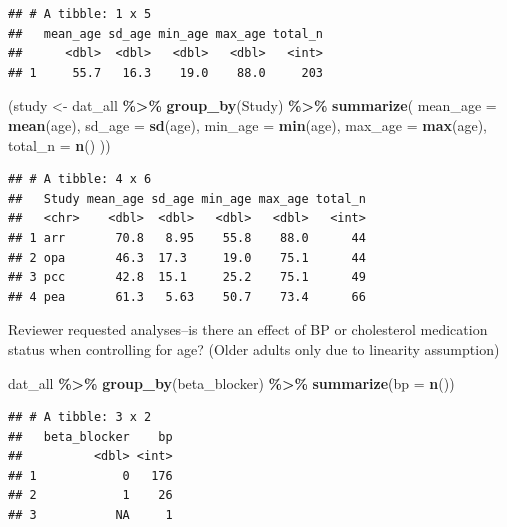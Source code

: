 \documentclass[
]{article}
\newenvironment{Shaded}{\begin{snugshade}}{\end{snugshade}}
\newcommand{\AttributeTok}[1]{\textcolor[rgb]{0.13,0.29,0.53}{#1}}
\newcommand{\FunctionTok}[1]{\textcolor[rgb]{0.13,0.29,0.53}{\textbf{#1}}}
\newcommand{\NormalTok}[1]{#1}
\newcommand{\OtherTok}[1]{\textcolor[rgb]{0.56,0.35,0.01}{#1}}
\newcommand{\SpecialCharTok}[1]{\textcolor[rgb]{0.81,0.36,0.00}{\textbf{#1}}}
\begin{document}
\begin{verbatim}
## # A tibble: 1 x 5
##   mean_age sd_age min_age max_age total_n
##      <dbl>  <dbl>   <dbl>   <dbl>   <int>
## 1     55.7   16.3    19.0    88.0     203
\end{verbatim}

\begin{Shaded}
\begin{Highlighting}[]
\NormalTok{(study }\OtherTok{\textless{}{-}}\NormalTok{ dat\_all }\SpecialCharTok{\%\textgreater{}\%}
  \FunctionTok{group\_by}\NormalTok{(Study) }\SpecialCharTok{\%\textgreater{}\%}
  \FunctionTok{summarize}\NormalTok{(}
    \AttributeTok{mean\_age =} \FunctionTok{mean}\NormalTok{(age),}
    \AttributeTok{sd\_age =} \FunctionTok{sd}\NormalTok{(age),}
    \AttributeTok{min\_age =} \FunctionTok{min}\NormalTok{(age),}
    \AttributeTok{max\_age =} \FunctionTok{max}\NormalTok{(age),}
    \AttributeTok{total\_n =} \FunctionTok{n}\NormalTok{()}
\NormalTok{  ))}
\end{Highlighting}
\end{Shaded}

\begin{verbatim}
## # A tibble: 4 x 6
##   Study mean_age sd_age min_age max_age total_n
##   <chr>    <dbl>  <dbl>   <dbl>   <dbl>   <int>
## 1 arr       70.8   8.95    55.8    88.0      44
## 2 opa       46.3  17.3     19.0    75.1      44
## 3 pcc       42.8  15.1     25.2    75.1      49
## 4 pea       61.3   5.63    50.7    73.4      66
\end{verbatim}

Reviewer requested analyses--is there an effect of BP or cholesterol
medication status when controlling for age? (Older adults only due to
linearity assumption)

\begin{Shaded}
\begin{Highlighting}[]
\NormalTok{dat\_all }\SpecialCharTok{\%\textgreater{}\%} \FunctionTok{group\_by}\NormalTok{(beta\_blocker) }\SpecialCharTok{\%\textgreater{}\%} \FunctionTok{summarize}\NormalTok{(}\AttributeTok{bp =} \FunctionTok{n}\NormalTok{())}
\end{Highlighting}
\end{Shaded}

\begin{verbatim}
## # A tibble: 3 x 2
##   beta_blocker    bp
##          <dbl> <int>
## 1            0   176
## 2            1    26
## 3           NA     1
\end{verbatim}
\end{document}
